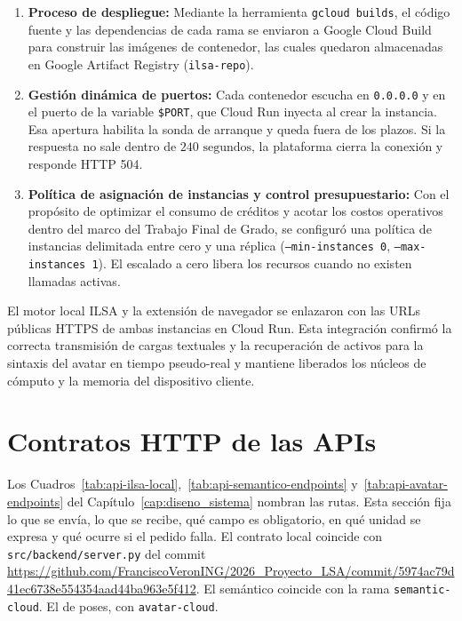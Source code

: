 \begin{enumerate}
    \item \textbf{Proceso de despliegue:} Mediante la herramienta \texttt{gcloud builds}, el código fuente y las dependencias de cada rama se enviaron a Google Cloud Build para construir las imágenes de contenedor, las cuales quedaron almacenadas en Google Artifact Registry (\texttt{ilsa-repo}).
    
    \item \textbf{Gestión dinámica de puertos:} Cada contenedor escucha en \texttt{0.0.0.0} y en el puerto de la variable \texttt{\$PORT}, que Cloud Run inyecta al crear la instancia. Esa apertura habilita la sonda de arranque y queda fuera de los plazos. Si la respuesta no sale dentro de $240\text{~segundos}$, la plataforma cierra la conexión y responde HTTP 504.
    
    \item \textbf{Política de asignación de instancias y control presupuestario:} Con el propósito de optimizar el consumo de créditos y acotar los costos operativos dentro del marco del Trabajo Final de Grado, se configuró una política de instancias delimitada entre cero y una réplica (\texttt{--min-instances 0}, \texttt{--max-instances 1}). El escalado a cero libera los recursos cuando no existen llamadas activas.
\end{enumerate}

El motor local ILSA y la extensión de navegador se enlazaron con las URLs públicas HTTPS de ambas instancias en Cloud Run. Esta integración confirmó la correcta transmisión de cargas textuales y la recuperación de activos para la sintaxis del avatar en tiempo pseudo-real y mantiene liberados los núcleos de cómputo y la memoria del dispositivo cliente.

\section{Contratos HTTP de las APIs}
\label{sec:contratos_http}

Los Cuadros~\ref{tab:api-ilsa-local},~\ref{tab:api-semantico-endpoints} y~\ref{tab:api-avatar-endpoints} del Capítulo~\ref{cap:diseno_sistema} nombran las rutas. Esta sección fija lo que se envía, lo que se recibe, qué campo es obligatorio, en qué unidad se expresa y qué ocurre si el pedido falla. El contrato local coincide con \texttt{src/backend/server.py} del commit \url{https://github.com/FranciscoVeronING/2026_Proyecto_LSA/commit/5974ac79d41ec6738e554354aad44ba963e5f412}. El semántico coincide con la rama \texttt{semantic-cloud}. El de poses, con \texttt{avatar-cloud}.

